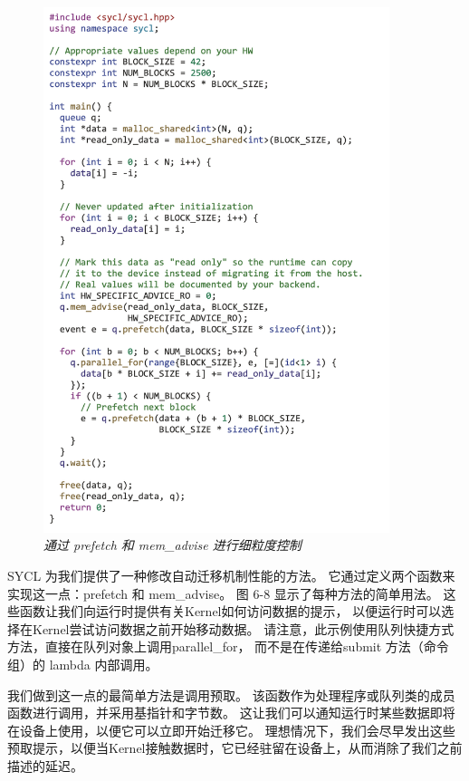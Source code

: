 \begin{figure}[H]
	\centering
	\includegraphics[width=0.9\textwidth]{figs/F6.8.png}
	\caption{\textit{通过 prefetch 和 mem\_advise 进行细粒度控制}}
\end{figure}

SYCL 为我们提供了一种修改自动迁移机制性能的方法。 它通过定义两个函数来实现这一点：prefetch 和 mem\_advise。 
图 6-8 显示了每种方法的简单用法。 这些函数让我们向运行时提供有关Kernel如何访问数据的提示，
以便运行时可以选择在Kernel尝试访问数据之前开始移动数据。 
请注意，此示例使用队列快捷方式方法，直接在队列对象上调用parallel\_for，
而不是在传递给submit 方法（命令组）的 lambda 内部调用。

我们做到这一点的最简单方法是调用预取。 该函数作为处理程序或队列类的成员函数进行调用，并采用基指针和字节数。 
这让我们可以通知运行时某些数据即将在设备上使用，以便它可以立即开始迁移它。 
理想情况下，我们会尽早发出这些预取提示，以便当Kernel接触数据时，它已经驻留在设备上，从而消除了我们之前描述的延迟。


